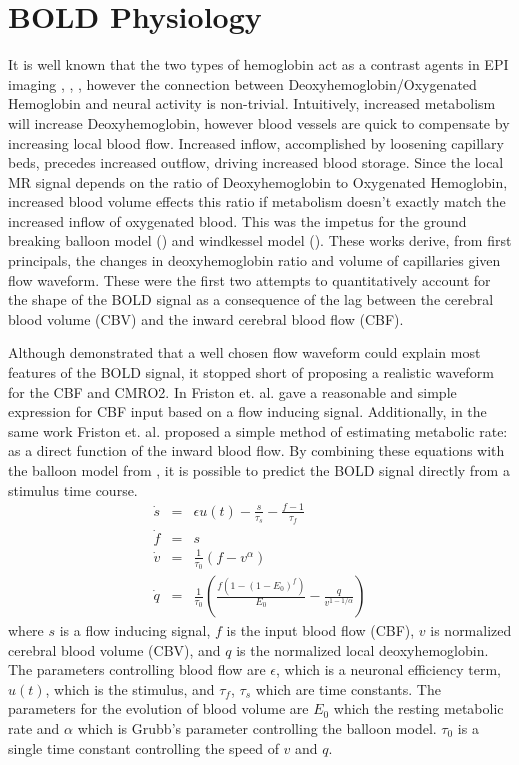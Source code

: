 \section{BOLD Physiology}
\label{sec:BOLD Physiology}
It is well known that the two types of hemoglobin act as a contrast agents in 
EPI imaging
\cite{Buxton1998}, \cite{WEISSKOFF1994}, \cite{Ogawa}, however the connection
between Deoxyhemoglobin/Oxygenated Hemoglobin and neural activity is non-trivial. 
Intuitively, increased 
metabolism will increase Deoxyhemoglobin, however blood vessels are quick
to compensate by increasing local blood flow. Increased inflow, accomplished by loosening 
capillary beds, precedes increased outflow, driving increased 
blood storage.
Since the local MR signal depends on the ratio of Deoxyhemoglobin to Oxygenated
Hemoglobin, increased blood volume effects this ratio if 
metabolism doesn't exactly match the increased inflow of oxygenated blood.
This was the impetus
for the ground breaking balloon model (\cite{Buxton1998}) and windkessel
model (\cite{Mandeville1999}). These works derive, from first principals,
the changes in deoxyhemoglobin ratio and volume of capillaries given flow waveform.
These were the first two attempts to quantitatively account for the shape of the 
BOLD signal as a consequence of the lag between the cerebral blood volume (CBV) 
and the inward cerebral blood flow (CBF). 

Although \cite{Buxton1998} demonstrated that a well chosen flow waveform could 
explain most features of the BOLD signal, it stopped short of proposing a
realistic waveform for the CBF and CMRO2. In \cite{Friston2000} Friston et. al.
gave a reasonable and simple
expression for CBF input based on a flow inducing signal.
Additionally, in the same work Friston et. al. proposed a simple method
of estimating metabolic rate: as a direct function of the inward blood flow.
By combining these equations with the balloon model from \cite{Buxton1998},
it is possible to predict the BOLD signal directly from a stimulus time course.
\begin{eqnarray}
\dot{s} &=& \epsilon u(t) - \frac{s}{\tau_s} - \frac{f - 1}{\tau_f} \\
\dot{f} &=& s\\
\dot{v} &=& \frac{1}{\tau_0}(f - v^\alpha)\\
\dot{q} &=& \frac{1}{\tau_0}(\frac{f(1-(1-E_0)^f)}{E_0} - \frac{q}{v^{1-1/\alpha}})
\label{eq:bold}
\end{eqnarray}
where $s$ is a flow inducing signal, $f$ is the input blood flow (CBF),
$v$ is normalized cerebral blood volume (CBV), and $q$ is the normalized
local deoxyhemoglobin. The 
parameters controlling blood flow are $\epsilon$, which is a neuronal 
efficiency term, $u(t)$, which is the stimulus, and $\tau_f$, $\tau_s$ 
which are time constants. The parameters for the evolution of blood 
volume are $E_0$ which the resting metabolic
rate and $\alpha$ which is Grubb's parameter controlling the balloon model. 
$\tau_0$ is a single time constant controlling the speed of $v$ and $q$.

